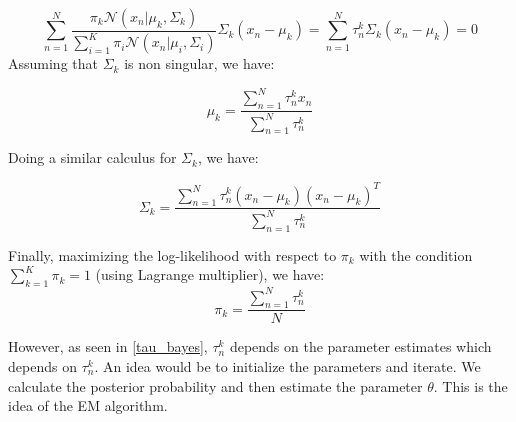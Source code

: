 \documentclass[12pt]{article}
\begin{document}
\begin{equation}
\sum_{n=1}^N\frac{\pi_k \mathcal N(x_n|\mu_k,\Sigma_k)}{\sum_{i=1}^K\pi_i\mathcal N(x_n|\mu_i,\Sigma_i)} \Sigma_k(x_n-\mu_k)=\sum_{n=1}^N \tau_n^k \Sigma_k(x_n-\mu_k)=0
\end{equation}
Assuming that $\Sigma_k$ is non singular, we have:

\begin{equation}
\mu_k=\frac{\sum_{n=1}^N\tau_n^k x_n}{\sum_{n=1}^N\tau_n^k}
\end{equation}

Doing a similar calculus for $\Sigma_k$, we have:

\begin{equation}
\Sigma_k=\frac{\sum_{n=1}^N \tau_n^k (x_n-\mu_k)(x_n-\mu_k)^T}{\sum_{n=1}^N\tau_n^k}
\end{equation}

Finally, maximizing the log-likelihood with respect to $\pi_k$ with the condition $\sum_{k=1}^K\pi_k=1$ (using Lagrange multiplier), we have:
\begin{equation}
\pi_k=\frac{\sum_{n=1}^N\tau_n^k}{N}
\end{equation}

However, as seen in \eqref{tau_bayes}, $\tau_n^k$ depends on the parameter estimates which depends on $\tau_n^k$. An idea would be to initialize the parameters and iterate. We calculate the posterior probability and then estimate the parameter $\theta$. This is the idea of the EM algorithm.
\\
\end{document}
